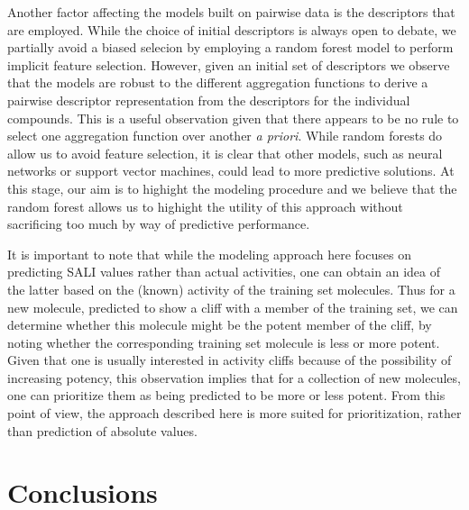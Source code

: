 \documentclass[letterpaper, 12pt]{article}
\begin{document}
Another factor affecting the models built on pairwise data is the
descriptors that are employed. While the choice of initial descriptors
is always open to debate, we partially avoid a biased selecion by
employing a random forest model to perform implicit feature
selection. However, given an initial set of descriptors we observe
that the models are robust to the different aggregation functions to
derive a pairwise descriptor representation from the descriptors for
the individual compounds. This is a useful observation given that
there appears to be no rule to select one aggregation function over
another \emph{a priori}. While random forests do allow us to avoid
feature selection, it is clear that other models, such as neural
networks or support vector machines, could lead to more predictive
solutions. At this stage, our aim is to highight the modeling
procedure and we believe that the random forest allows us to highight
the utility of this approach without sacrificing too much by way of
predictive performance.

It is important to note that while the modeling approach here focuses
on predicting SALI values rather than actual activities, one can
obtain an idea of the latter based on the (known) activity of the
training set molecules. Thus for a new molecule, predicted to show a
cliff with a member of the training set, we can determine whether this
molecule might be the potent member of the cliff, by noting whether
the corresponding training set molecule is less or more potent. Given
that one is usually interested in activity cliffs because of the
possibility of increasing potency, this observation implies that for a
collection of new molecules, one can prioritize them as being
predicted to be more or less potent. From this point of view, the
approach described here is more suited for prioritization, rather than
prediction of absolute values.

\section{Conclusions}
\label{sec:conclusions}
\end{document}
